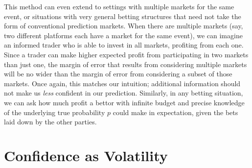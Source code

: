 \documentclass[sigconf,anonymous]{aamas}   %
\newcommand{\rupert}[1]{\ifnum\Chatty=1 \textcolor{red}   {Rupert: [#1]} \fi}
\newcommand{\dreev} [1]{\ifnum\Chatty=1 \textcolor{purple}{dreev:  [#1]} \fi}
\begin{document}
This method can even extend to settings with multiple markets for the same event, or situations with very general betting structures that need not take the form of conventional prediction markets. When there are multiple markets (say, two different platforms each have a market for the same event), we can imagine an informed trader who is able to invest in all markets, profiting from each one. Since a trader can make higher expected profit from participating in two markets than just one, the margin of error that results from considering multiple markets will be no wider than the margin of error from considering a subset of those markets. Once again, this matches our intuition; additional information should not make us \emph{less} confident in our prediction. Similarly, in any betting situation, we can ask how much profit a bettor with infinite budget and precise knowledge of the underlying true probability $p$ could make in expectation, given the bets laid down by the other parties.



\section{Confidence as Volatility}
\label{sec:options}


\end{document}

